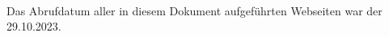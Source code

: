 \Hinweise

\paragraph*{}

Das Abrufdatum aller in diesem Dokument aufgeführten Webseiten war der 29.10.2023.